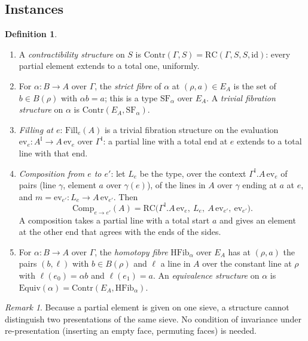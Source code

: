 \documentclass[11pt]{article}
\newcommand{\I}{\mathbb{I}}
\newcommand{\HFib}{\mathrm{HFib}}
\newcommand{\RC}{\mathrm{RC}}
\newcommand{\Contr}{\mathrm{Contr}}
\newcommand{\Comp}{\mathrm{Comp}}
\newcommand{\Equiv}{\mathrm{Equiv}}
\newcommand{\id}{\mathrm{id}}
\theoremstyle{plain}
\theoremstyle{definition}
\newtheorem{definition}[theorem]{Definition}
\theoremstyle{remark}
\newtheorem{remark}[theorem]{Remark}
\begin{document}
\subsection{Instances}

\begin{definition}
\leavevmode
\begin{enumerate}
\item A \emph{contractibility structure} on $S$ is
  $\Contr(\Gamma,S)=\RC(\Gamma,S,S,\id)$: every partial element extends
  to a total one, uniformly.
\item For $\alpha:B\to A$ over $\Gamma$, the \emph{strict fibre} of
  $\alpha$ at $(\rho,a)\in E_A$ is the set of $b\in B(\rho)$ with
  $\alpha b=a$; this is a type $\mathrm{SF}_\alpha$ over $E_A$. A
  \emph{trivial fibration structure} on $\alpha$ is
  $\Contr(E_A,\mathrm{SF}_\alpha)$.
\item \emph{Filling at $e$}: $\mathrm{Fill}_e(A)$ is a trivial fibration
  structure on the evaluation $\mathrm{ev}_e:A^\I\to A\,\mathrm{ev}_e$
  over $\Gamma^\I$: a partial line with a total end at $e$ extends to a
  total line with that end.
\item \emph{Composition from $e$ to $e'$}: let $L_e$ be the type, over the
  context $\Gamma^\I.A\,\mathrm{ev}_e$ of pairs (line $\gamma$, element
  $a$ over $\gamma(e)$), of the lines in $A$ over $\gamma$ ending at $a$
  at $e$, and $m=\mathrm{ev}_{e'}:L_e\to A\,\mathrm{ev}_{e'}$. Then
  \[
  \Comp_{e\to e'}(A)=\RC\bigl(\Gamma^\I.A\,\mathrm{ev}_e,\ L_e,\
  A\,\mathrm{ev}_{e'},\ \mathrm{ev}_{e'}\bigr).
  \]
  A composition takes a partial line with a total start $a$ and gives an
  element at the other end that agrees with the ends of the sides.
\item For $\alpha:B\to A$ over $\Gamma$, the \emph{homotopy fibre}
  $\HFib_\alpha$ over $E_A$ has at $(\rho,a)$ the pairs $(b,\ell)$ with
  $b\in B(\rho)$ and $\ell$ a line in $A$ over the constant line at $\rho$
  with $\ell(e_0)=\alpha b$ and $\ell(e_1)=a$. An \emph{equivalence
  structure} on $\alpha$ is $\Equiv(\alpha)=\Contr(E_A,\HFib_\alpha)$.
\end{enumerate}
\end{definition}

\begin{remark}
Because a partial element is given on one sieve, a structure cannot
distinguish two presentations of the same sieve. No condition of
invariance under re-presentation (inserting an empty face, permuting
faces) is needed.
\end{remark}
\end{document}
